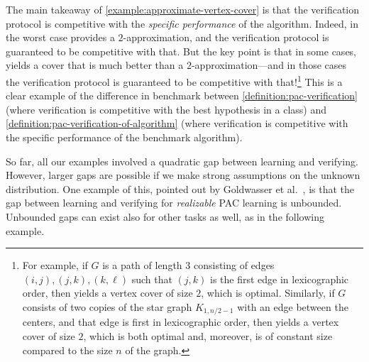 \documentclass[11pt]{article}
\begin{document}
The main takeaway of \cref{example:approximate-vertex-cover} is that the verification protocol is competitive with the \emph{specific performance} of the algorithm. Indeed, in the worst case  provides a {$2$-approximation}, and the verification protocol is guaranteed to be competitive with that. But the key point is that in some cases,  yields a cover that is much better than a {$2$-approximation}---and in those cases the verification protocol is guaranteed to be competitive with that!\footnote{%
	For example, if $G$ is a path of length $3$ consisting of edges $(i,j), (j,k), (k,\ell)$ such that $(j,k)$ is the first edge in lexicographic order, then  yields a vertex cover of size $2$, which is optimal. Similarly, if $G$ consists of two copies of the star graph $K_{1,n/2-1}$ with an edge between the centers, and that edge is first in lexicographic order, then  yields a vertex cover of size $2$, which is both optimal and, moreover, is of constant size compared to the size $n$ of the graph.%
} This is a clear example of the difference in benchmark between \cref{definition:pac-verification} (where verification is competitive with the best hypothesis in a class) and \cref{definition:pac-verification-of-algorithm} (where verification is competitive with the specific performance of the benchmark algorithm).

So far, all our examples involved a quadratic gap between learning and verifying. However, larger gaps are possible if we make strong assumptions on the unknown distribution. One example of this, pointed out by Goldwasser et al.\ \cite{GoldwasserRSY21}, is that the gap between learning and verifying for \emph{realizable} PAC learning is unbounded. Unbounded gaps can exist also for other tasks as well, as in the following example.
\end{document}
